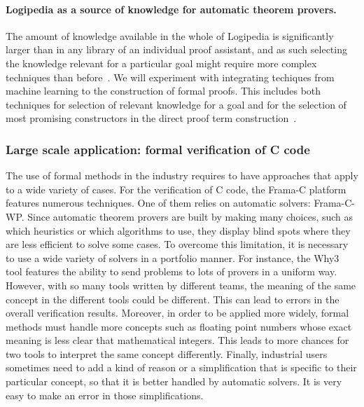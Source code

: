 \paragraph*{Logipedia as a source of knowledge for automatic theorem provers.}
The amount of knowledge available in the whole of Logipedia is
significantly larger than in any library of an individual proof assistant,
and as such selecting the knowledge relevant for a
particular goal might require more complex techniques than
before~\cite{Irving-deepmath}.  We will experiment with integrating techiques
from machine learning to the construction of formal proofs. This includes both techniques
for selection of relevant knowledge for a goal and for the selection
of most promising constructors in the direct proof term
construction~\cite{ZielenkiewiczSchubert2016}.

\subsubsection*{Large scale application: formal verification of C code}

The use of formal methods in the industry requires to have approaches
that apply to a wide variety of cases. For the verification of C code,
the Frama-C platform features numerous techniques. One of them relies
on automatic solvers: Frama-C-WP. Since automatic theorem provers are
built by making many choices, such as which heuristics or which
algorithms to use, they display blind spots where they are less
efficient to solve some cases. To overcome this limitation, it is
necessary to use a wide variety of solvers in a portfolio manner. For
instance, the Why3 tool features the ability to send problems to lots
of provers in a uniform way. However, with so many tools written by
different teams, the meaning of the same concept in the different
tools could be different. This can lead to errors in the overall
verification results. Moreover, in order to be applied more widely,
formal methods must handle more concepts such as floating point
numbers whose exact meaning is less clear that mathematical
integers. This leads to more chances for two tools to interpret the
same concept differently. Finally, industrial users sometimes need to
add a kind of reason or a simplification that is specific to their
particular concept, so that it is better handled by automatic
solvers. It is very easy to make an error in those simplifications.

